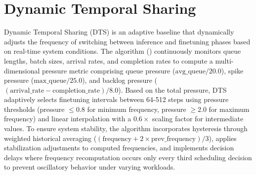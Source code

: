 \newpage

\appendix

\section{Dynamic Temporal Sharing}
\label{sec:dts-appendix}

Dynamic Temporal Sharing (DTS) is an adaptive baseline that dynamically adjusts the frequency of switching between inference and finetuning phases based on real-time system conditions. The algorithm () continuously monitors queue lengths, batch sizes, arrival rates, and completion rates to compute a multi-dimensional pressure metric comprising queue pressure ($\text{avg\_queue}/20.0$), spike pressure ($\text{max\_queue}/25.0$), and backlog pressure ($(\text{arrival\_rate} - \text{completion\_rate})/8.0$). Based on the total pressure, DTS adaptively selects finetuning intervals between 64-512 steps using pressure thresholds (pressure $\leq 0.8$ for minimum frequency, pressure $\geq 2.0$ for maximum frequency) and linear interpolation with a $0.6\times$ scaling factor for intermediate values. To ensure system stability, the algorithm incorporates hysteresis through weighted historical averaging ($(\text{frequency} + 2 \times \text{prev\_frequency})/3$), applies stabilization adjustments to computed frequencies, and implements decision delays where frequency recomputation occurs only every third scheduling decision to prevent oscillatory behavior under varying workloads.

